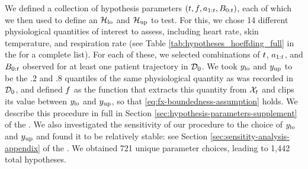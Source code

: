 

We defined a collection of hypothesis parameters $(t, f, a_{1:t}, B_{0:t})$, each of which we then used to define an $\mathcal{H}_{\mathrm{lo}}$ and $\mathcal{H}_{\mathrm{up}}$ to test.
For this, we chose 14 different physiological quantities of interest to assess, including heart rate, skin temperature, and respiration rate (see Table \ref{tab:hypotheses_hoeffding_full} in the \AppendixName for a complete list).
For each of these, we selected combinations of $t$, $a_{1:t}$, and $B_{0:t}$ observed for at least one patient trajectory in $\mathcal{D}_0$.
We took \(y_{\mathrm{lo}}\) and \(y_{\mathrm{up}}\) to be the .2 and .8 quantiles of the same physiological quantity as was recorded in $\mathcal{D}_0$, and defined $f$ as the function that extracts this quantity from \(\mathcal{X}_t\) and clips its value between \(y_{\mathrm{lo}}\) and \(y_{\mathrm{up}}\), so that \eqref{eq:fx-boundedness-assumption} holds.
We describe this procedure in full in Section \ref{sec:hypothesis-parameters-supplement} of the \AppendixName.
We also investigated the sensitivity of our procedure to the choice of $y_{\mathrm{lo}}$ and $y_{\mathrm{up}}$ and found it to be relatively stable: see Section \ref{sec:sensitity-analysis-appendix} of the \AppendixName.
We obtained 721 unique parameter choices, leading to 1,442 total hypotheses.


